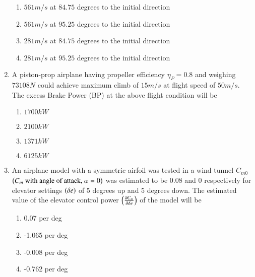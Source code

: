 \documentclass[journal]{IEEEtran}
\begin{document}
\begin{enumerate}
    \begin{enumerate}
        \item $561 m/s$ at $84.75$ degrees to the initial direction
        \item $561 m/s$ at $95.25$ degrees to the initial direction
        \item $281 m/s$ at $84.75$ degrees to the initial direction
        \item $281 m/s$ at $95.25$ degrees to the initial direction
    \end{enumerate}

    \item A piston-prop airplane having propeller efficiency $\eta_P = 0.8$ and weighing $73108 N$
    could achieve maximum climb of $15 m/s$ at flight speed of $50 m/s$. The excess Brake Power (BP)
    at the above flight condition will be

    \begin{multicols}{4}
        \begin{enumerate}
            \item $1700 kW$
            \item $2100 kW$
            \item $1371 kW$
            \item $6125 kW$
        \end{enumerate}
    \end{multicols}

\item An airplane model with a symmetric airfoil was tested in a wind tunnel $C_{m0}$ $\left(C_m\text{ with
    angle of attack, }\alpha = 0\right)$ was estimated to be $0.08$ and $0$ respectively for elevator settings
    $\left(\delta e\right)$ of 5 degrees up and 5 degrees down. The estimated value of the elevator control power
    $\left(\frac{\partial C_m}{\partial \delta e}\right)$ of the model will be

    \begin{multicols}{2}
        \begin{enumerate}
            \item 0.07 per deg
            \item -1.065 per deg
            \item -0.008 per deg
            \item -0.762 per deg
        \end{enumerate}
    \end{multicols}

\end{enumerate}
\end{document}
